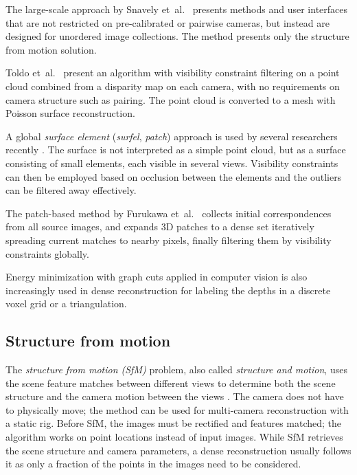 The large-scale approach by Snavely et~al.\ \cite{snavely2006photo} presents methods and user interfaces that are not restricted on pre-calibrated or pairwise cameras, but instead are designed for unordered image collections.
The method presents only the structure from motion solution.

Toldo et~al.\ \cite{toldo2013accurate,toldo2013towards} present an algorithm with visibility constraint filtering on a point cloud combined from a disparity map on each camera, with no requirements on camera structure such as pairing.
The point cloud is converted to a mesh with Poisson surface reconstruction.

A global \emph{surface element} (\emph{surfel}, \emph{patch}) approach is used by several researchers recently \cite{carceroni2002multi,furukawa2010accurate,vu2012high,chang2011gpu}.
The surface is not interpreted as a simple point cloud, but as a surface consisting of small elements, each visible in several views.
Visibility constraints can then be employed based on occlusion between the elements and the outliers can be filtered away effectively.

The patch-based method by Furukawa et~al.\ \cite{furukawa2012patch,furukawa2010accurate} collects initial correspondences from all source images, and expands 3D patches to a dense set iteratively spreading current matches to nearby pixels, finally filtering them by visibility constraints globally.

Energy minimization with graph cuts applied in computer vision \cite{boykov2004experimental} is also increasingly used in dense reconstruction \cite{chang2011gpu,vu2012high,labatut2009robust,jancosek2011multi} for labeling the depths in a discrete voxel grid or a triangulation.


\subsection{Structure from motion} \label{sec:sfm} %


The \emph{structure from motion (SfM)} problem, also called \emph{structure and motion}, uses the scene feature matches between different views to determine both the scene structure and the camera motion between the views \cite{snavely2006photo,fitzgibbon1998automatic,pollefeys2004visual}.
The camera does not have to physically move; the method can be used for multi-camera reconstruction with a static rig.
Before SfM, the images must be rectified and features matched; the algorithm works on point locations instead of input images.
While SfM retrieves the scene structure and camera parameters, a dense reconstruction usually follows it as only a fraction of the points in the images need to be considered. \cite{pollefeys2004visual}

